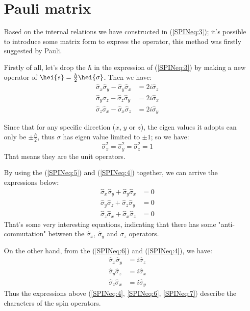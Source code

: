 \section{Pauli matrix}
%
%
Based on the internal relations we have constructed in
(\ref{SPINeq:3}); it's possible to introduce some matrix form to
express the operator, this method was firstly suggested by Pauli.

Firstly of all, let's drop the $\hbar$ in the expression of
(\ref{SPINeq:3}) by making a new operator of $\hei{s} =
\frac{\hbar}{2}\hei{\sigma}$. Then we have:
\begin{align}\label{SPINeq:4}
\hat{\sigma}_{x}\hat{\sigma}_{y} - \hat{\sigma}_{y}\hat{\sigma}_{x}
&= 2i\hat{\sigma}_{z}
\nonumber \\
\hat{\sigma}_{y}\hat{\sigma}_{z} - \hat{\sigma}_{z}\hat{\sigma}_{y}
&= 2i\hat{\sigma}_{x}
\nonumber \\
\hat{\sigma}_{z}\hat{\sigma}_{x} - \hat{\sigma}_{x}\hat{\sigma}_{z}
&= 2i\hat{\sigma}_{y}
\end{align}

Since that for any specific direction ($x$, $y$ or $z$), the eigen
values it adopts can only be $\pm\frac{\hbar}{2}$, thus $\sigma$ has
eigen value limited to $\pm 1$; so we have:
\begin{equation}\label{SPINeq:5}
\hat{\sigma}_{x}^{2} = \hat{\sigma}_{y}^{2} = \hat{\sigma}_{z}^{2} =
1
\end{equation}
That means they are the unit operators.

By using the (\ref{SPINeq:5}) and (\ref{SPINeq:4}) together, we can
arrive the expressions below:
\begin{align}\label{SPINeq:6}
\hat{\sigma}_{x}\hat{\sigma}_{y} + \hat{\sigma}_{y}\hat{\sigma}_{x}
&= 0
\nonumber \\
\hat{\sigma}_{y}\hat{\sigma}_{z} + \hat{\sigma}_{z}\hat{\sigma}_{y}
&= 0
\nonumber \\
\hat{\sigma}_{z}\hat{\sigma}_{x} + \hat{\sigma}_{x}\hat{\sigma}_{z}
&= 0
\end{align}
That's some very interesting equations, indicating that there has
some "anti-commutation" between the $\hat{\sigma}_{x}$,
$\hat{\sigma}_{y}$ and $\hat{\sigma}_{z}$ operators.

On the other hand, from the (\ref{SPINeq:6}) and (\ref{SPINeq:4}),
we have:
\begin{align}\label{SPINeq:7}
\hat{\sigma}_{x}\hat{\sigma}_{y} &= i\hat{\sigma}_{z}
\nonumber \\
\hat{\sigma}_{y}\hat{\sigma}_{z} &= i\hat{\sigma}_{x}
\nonumber \\
\hat{\sigma}_{z}\hat{\sigma}_{x} &= i\hat{\sigma}_{y}
\end{align}
Thus the expressions above (\ref{SPINeq:4}, \ref{SPINeq:6},
\ref{SPINeq:7}) describe the characters of the spin operators.

